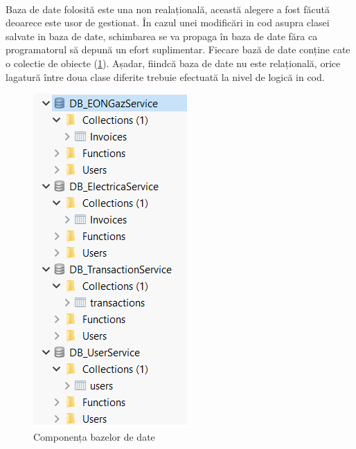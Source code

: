 \documentclass[12pt]{report}
\begin{document}
	\paragraph{}Baza de date folosită este una non realațională, această alegere a fost făcută deoarece este usor de gestionat. În cazul unei modificări in cod asupra clasei salvate in baza de date, schimbarea se va propaga în baza de date făra ca programatorul să depună un efort suplimentar. Fiecare bază de date conține cate o colectie de obiecte (\ref{dbopen}). Așadar, fiindcă baza de date nu este relațională, orice lagatură între doua clase diferite trebuie efectuată la nivel de logică in cod.
	\begin{figure}[h]
  	\centering
  	\includegraphics[scale=0.86]{dbopen}
	\caption{Componența bazelor de date}  
	\label{dbopen}
  	\end{figure}
\end{document}
